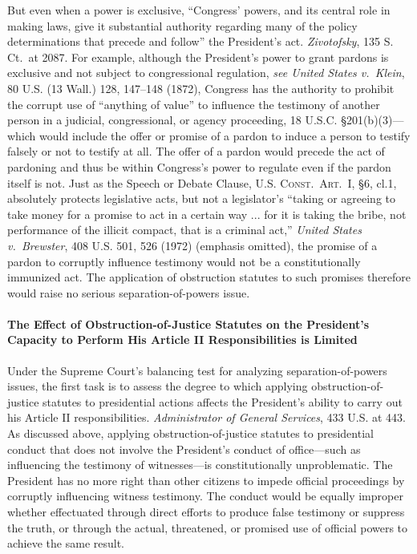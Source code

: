 But even when a power is exclusive, “Congress’ powers, and its central role in making laws, give it substantial authority regarding many of the policy determinations that precede and follow” the President’s act.
\textit{Zivotofsky}, 135 S. Ct.~at 2087.
For example, although the President’s power to grant pardons is exclusive and not subject to congressional regulation, \textit{see United States v.\ Klein}, 80 U.S. (13 Wall.) 128, 147--148 (1872), Congress has the authority to prohibit the corrupt use of “anything of value” to influence the testimony of another person in a judicial, congressional, or agency proceeding, 18 U.S.C. \S 201(b)(3)---which would include the offer or promise of a pardon to induce a person to testify falsely or not to testify at all.
The offer of a pardon would precede the act of pardoning and thus be within Congress’s power to regulate even if the pardon itself is not.
Just as the Speech or Debate Clause, \textsc{U.S. Const.\ Art.~I}, \S 6, cl.1, absolutely protects legislative acts, but not a legislator’s “taking or agreeing to take money for a promise to act in a certain way ... for it is taking the bribe, not performance of the illicit compact, that is a criminal act,” \textit{United States v.\ Brewster}, 408 U.S. 501, 526 (1972) (emphasis omitted), the promise of a pardon to corruptly influence testimony would not be a constitutionally immunized act.
The application of obstruction statutes to such promises therefore would raise no serious separation-of-powers issue.

\paragraph{The Effect of Obstruction-of-Justice Statutes on the President’s Capacity to Perform His Article II Responsibilities is Limited}

Under the Supreme Court’s balancing test for analyzing separation-of-powers issues, the first task is to assess the degree to which applying obstruction-of-justice statutes to presidential actions affects the President’s ability to carry out his Article II responsibilities.
\textit{Administrator of General Services}, 433 U.S. at 443.
As discussed above, applying obstruction-of-justice statutes to presidential conduct that does not involve the President’s conduct of office---such as influencing the testimony of witnesses---is constitutionally unproblematic.
The President has no more right than other citizens to impede official proceedings by corruptly influencing witness testimony.
The conduct would be equally improper whether effectuated through direct efforts to produce false testimony or suppress the truth, or through the actual, threatened, or promised use of official powers to achieve the same result.

